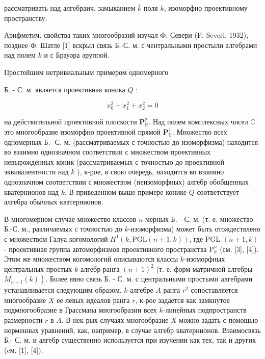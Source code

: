\documentclass[10pt]{article}
\begin{document}
рассматривать над алгебраич. замыканием $\bar{k}$ поля $k$, изоморфно проективному пространству.



Арифметич. свойства таких многообразий изучал Ф. Севери (F. Severi, 1932), позднее Ф. Шатле [1] вскрыл связь Б.-С. м. с чентральными простыли алгебрами над полем $k$ и с Брауәра әруппой.



Простейшим нетривиальным примером одномерного



Б. - С. м. является проективная коника $Q$ :



\[

x_{0}^{2}+x_{1}^{2}+x_{2}^{2}=0

\]



на действительной проективной плоскости $\mathbf{P}_{\mathbb{R}}^{2}$. Над полем комплексных чисел $\mathbb{C}$ это многообразие изоморфно проективной прямой $\mathbf{P}_{\mathbb{C}}^{1}$. Множество всех одномерных Б.- С. м. (рассматриваемых с точностью до изоморфизма) находится во взаимно однозначном соответствии с множеством проективных невырожденных коник (рассматриваемых с точностью до проективной эквивалентности над $k$ ), к-рое, в свою очередь, находится во взаимно однозначном соответствии с множеством (неизоморфных) алгебр обобщенных кватернионов над $k$. В приведенном выше примере конике $Q$ соответствует алгебра обычных кватернионов.



В многомерном случае множество классов $n$-мерных Б. - С. м. (т. е. множество Б.-С. м., различаемых с точностью до $k$-изоморфизма) может быть отождествлено с множеством Галуа когомологий $H^{1}(k, \mathrm{PGL}(n+1, k))$, где PGL $(n+1, k)$ - проективная группа автоморфизмов проективного пространства $\mathrm{P}_{k}^{n}$ (см. [3], [4]). Этим же множеством когомологий описываются классы $k$-изоморфных центральных простых $k$-алгебр ранга $(n+1)^{2}$ (т. е. форм матричной алгебры $\left.M_{n+1}(k)\right)$. Более явно связь Б. - С. м. с центральными простыми алгебрами устанавливается следующим образом. $k$-алгебре $A$ ранга $r^{2}$ сопоставляется многообразие $X$ ее левых идеалов ранга $r$, к-рое задается как замкнутое подмногообразие в Грассмана многообразии всех $k$-линейных подпространств размерности $r$ в $A$. В нек-рых случаях многообразие $X$ можно задать с помощью норменных уравнений, как, например, в случае алгебр кватернионов. Взаимосвязь Б.- С. м. и алгебр существенно используется при изучении как тех, так и других (cм. [1], [4]).
\end{document}
